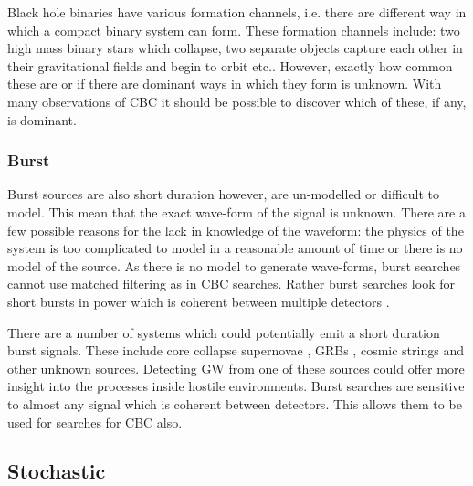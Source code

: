 Black hole binaries have various formation channels, i.e. there are different way in which a compact binary system can form. 
These formation channels include: two high mass binary stars which collapse, two separate objects capture each other in their gravitational fields and begin to orbit etc..
However, exactly how common these are or if there are dominant ways in which they form is unknown. 
With many observations of \ac{CBC} it should be possible to discover which of these, if any, is dominant.


\subsubsection{\label{sources:transient:burst}Burst}

Burst sources are also short duration however, are un-modelled or difficult to model.
This mean that the exact wave-form of the signal is unknown.
There are a few possible reasons for the lack in knowledge of the waveform: the physics of the system is too complicated to model in a reasonable amount of time or there is no model of the source.
As there is no model to generate wave-forms, burst searches cannot use matched filtering as in \ac{CBC} searches.
Rather burst searches look for short bursts in power which is coherent between multiple detectors \citep{Cornish2015Bayeswave:Glitches,Klimenko2008ABursts}.

There are a number of systems which could potentially emit a short duration burst signals.
These include core collapse supernovae \citep{Ott2008TheSupernovae}, \acp{GRB} \citep{Aasi2014SearchNetwork}, cosmic strings \citep{Damour2005GravitationalWindows} and other unknown sources.
Detecting \ac{GW} from one of these sources could offer more insight into the processes inside hostile environments.
Burst searches are sensitive to almost any signal which is coherent between detectors. 
This allows them to be used for searches for \ac{CBC} also.



\subsection{Stochastic}

